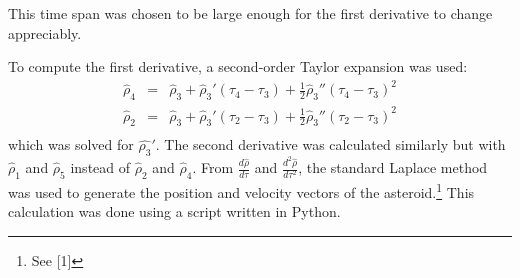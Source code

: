 \documentclass[12pt,journal,compsoc]{IEEEtran}
\begin{document}
This time span was chosen to be large enough for the first derivative to change appreciably.


To compute the first derivative, a second-order Taylor expansion was used:
\begin{eqnarray*}
\hat{\rho}_4&=&\hat{\rho}_3+\hat{\rho}_3' (\tau_4-\tau_3)+\frac{1}{2}\hat{\rho}_3'' (\tau_4-\tau_3)^2\\
\hat{\rho}_2&=&\hat{\rho}_3+\hat{\rho}_3' (\tau_2-\tau_3)+\frac{1}{2}\hat{\rho}_3'' (\tau_2-\tau_3) ^2\\
\end{eqnarray*}
which was solved for $\hat{\rho_3}'$.
The second derivative was calculated similarly but with $\hat{\rho}_1$ and $\hat{\rho}_5$ 
instead of $\hat{\rho}_2$ and $\hat{\rho}_4$.
From $\frac{d\hat{\rho}}{d\tau}$ and $\frac{d^2\hat{\rho}}{d\tau^2}$, 
the standard Laplace method was used to generate the position and velocity vectors of the asteroid.\footnote{See [1]}
This calculation was done using a script written in Python.
\end{document}
